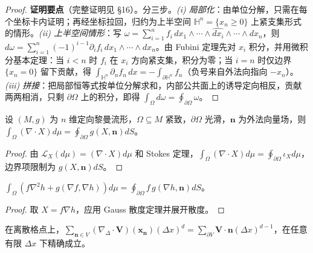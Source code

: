 \begin{proof}
\textbf{证明要点}（完整证明见 \cite{lee2012smooth} \S{}16）。分三步。\emph{(i) 局部化}：由单位分解，只需在每个坐标卡内证明；再经坐标拉回，归约为上半空间 $\mathbb{H}^n=\{x_n\ge0\}$ 上紧支集形式的情形。\emph{(ii) 上半空间情形}：写 $\omega=\sum_{i=1}^{n}f_i\,dx_1\wedge\cdots\wedge\widehat{dx_i}\wedge\cdots\wedge dx_n$，则 $d\omega=\sum_{i=1}^{n}(-1)^{i-1}\partial_i f_i\,dx_1\wedge\cdots\wedge dx_n$。由 Fubini 定理先对 $x_i$ 积分，并用微积分基本定理：当 $i<n$ 时 $f_i$ 在 $x_i$ 方向紧支集，积分为零；当 $i=n$ 时仅边界 $\{x_n=0\}$ 留下贡献，得 $\int_{\mathbb{H}^n}\partial_n f_n\,dx=-\int_{\partial\mathbb{H}^n}f_n$（负号来自外法向指向 $-x_n$）。\emph{(iii) 拼接}：把局部恒等式按单位分解求和，内部公共面上的诱导定向相反，贡献两两相消，只剩 $\partial\Omega$ 上的积分，即得 $\int_\Omega d\omega=\oint_{\partial\Omega}\omega$。
\end{proof}

\begin{theorem}\label{thm:gauss_divergence_manifold}
设 $(M,g)$ 为 $n$ 维定向黎曼流形，$\Omega\subseteq M$ 紧致，$\partial\Omega$ 光滑，$\mathbf{n}$ 为外法向量场，则 $\int_\Omega(\nabla\cdot X)d\mu=\oint_{\partial\Omega}g(X,\mathbf{n})dS$。
\end{theorem}

\begin{proof}
由 $\mathcal{L}_X(d\mu)=(\nabla\cdot X)d\mu$ 和 Stokes 定理，$\int_\Omega(\nabla\cdot X)d\mu=\oint_{\partial\Omega}\iota_Xd\mu$，边界项限制为 $g(X,\mathbf{n})dS$。
\end{proof}

\begin{corollary}\label{cor:green_identity}
$\int_\Omega(f\nabla^2h+g(\nabla f,\nabla h))d\mu=\oint_{\partial\Omega}f\,g(\nabla h,\mathbf{n})dS$。
\end{corollary}

\begin{proof}
取 $X=f\nabla h$，应用 Gauss 散度定理并展开散度。
\end{proof}

\begin{proposition}\label{prop:discrete_green_divergence}
在离散格点上，$\sum_{\mathbf{n}\in V}(\nabla_{\Delta}\cdot\mathbf{V})(\mathbf{x}_{\mathbf{n}})(\Delta x)^d=\sum_{\partial V}\mathbf{V}\cdot\mathbf{n}(\Delta x)^{d-1}$，在任意有限 $\Delta x$ 下精确成立。
\end{proposition}

